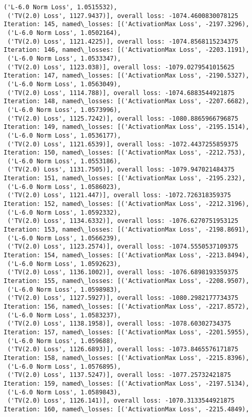 \documentclass[10pt]{article}
\begin{document}
\begin{Verbatim}[commandchars=\\\{\}]
 ('L-6.0 Norm Loss', 1.0515532),
 ('TV(2.0) Loss', 1127.9437)], overall loss: -1074.4600830078125
Iteration: 145, named\_losses: [('ActivationMax Loss', -2197.3296),
 ('L-6.0 Norm Loss', 1.0502164),
 ('TV(2.0) Loss', 1121.4225)], overall loss: -1074.8568115234375
Iteration: 146, named\_losses: [('ActivationMax Loss', -2203.1191),
 ('L-6.0 Norm Loss', 1.0533347),
 ('TV(2.0) Loss', 1123.038)], overall loss: -1079.0279541015625
Iteration: 147, named\_losses: [('ActivationMax Loss', -2190.5327),
 ('L-6.0 Norm Loss', 1.0563049),
 ('TV(2.0) Loss', 1114.788)], overall loss: -1074.6883544921875
Iteration: 148, named\_losses: [('ActivationMax Loss', -2207.6682),
 ('L-6.0 Norm Loss', 1.0573996),
 ('TV(2.0) Loss', 1125.7242)], overall loss: -1080.8865966796875
Iteration: 149, named\_losses: [('ActivationMax Loss', -2195.1514),
 ('L-6.0 Norm Loss', 1.0536177),
 ('TV(2.0) Loss', 1121.6539)], overall loss: -1072.4437255859375
Iteration: 150, named\_losses: [('ActivationMax Loss', -2212.753),
 ('L-6.0 Norm Loss', 1.0553186),
 ('TV(2.0) Loss', 1131.7505)], overall loss: -1079.947021484375
Iteration: 151, named\_losses: [('ActivationMax Loss', -2195.232),
 ('L-6.0 Norm Loss', 1.0586023),
 ('TV(2.0) Loss', 1121.447)], overall loss: -1072.726318359375
Iteration: 152, named\_losses: [('ActivationMax Loss', -2212.3196),
 ('L-6.0 Norm Loss', 1.0592332),
 ('TV(2.0) Loss', 1134.6332)], overall loss: -1076.6270751953125
Iteration: 153, named\_losses: [('ActivationMax Loss', -2198.8691),
 ('L-6.0 Norm Loss', 1.0566239),
 ('TV(2.0) Loss', 1123.2574)], overall loss: -1074.5550537109375
Iteration: 154, named\_losses: [('ActivationMax Loss', -2213.8494),
 ('L-6.0 Norm Loss', 1.0592623),
 ('TV(2.0) Loss', 1136.1002)], overall loss: -1076.6898193359375
Iteration: 155, named\_losses: [('ActivationMax Loss', -2208.9507),
 ('L-6.0 Norm Loss', 1.0598983),
 ('TV(2.0) Loss', 1127.5927)], overall loss: -1080.2982177734375
Iteration: 156, named\_losses: [('ActivationMax Loss', -2217.8572),
 ('L-6.0 Norm Loss', 1.0583237),
 ('TV(2.0) Loss', 1138.1958)], overall loss: -1078.60302734375
Iteration: 157, named\_losses: [('ActivationMax Loss', -2201.5955),
 ('L-6.0 Norm Loss', 1.059688),
 ('TV(2.0) Loss', 1126.6893)], overall loss: -1073.8465576171875
Iteration: 158, named\_losses: [('ActivationMax Loss', -2215.8396),
 ('L-6.0 Norm Loss', 1.0576895),
 ('TV(2.0) Loss', 1137.5247)], overall loss: -1077.25732421875
Iteration: 159, named\_losses: [('ActivationMax Loss', -2197.5134),
 ('L-6.0 Norm Loss', 1.0589843),
 ('TV(2.0) Loss', 1126.141)], overall loss: -1070.3133544921875
Iteration: 160, named\_losses: [('ActivationMax Loss', -2215.4849),

\end{Verbatim}
\end{document}
